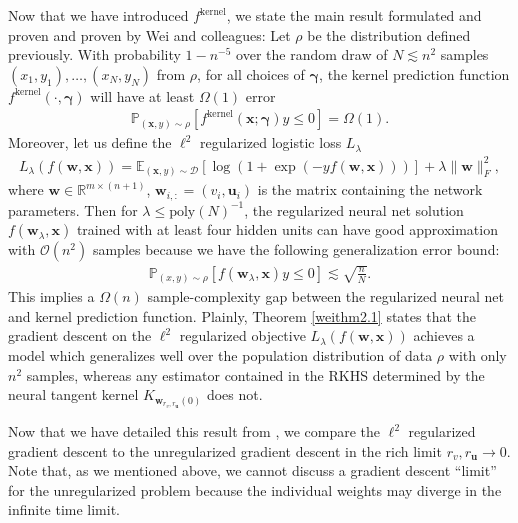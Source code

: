 \documentclass{article}
\newenvironment{manualtheorem}[1]{%
  \renewcommand\themanualtheoreminner{#1}%
  \manualtheoreminner
}{\endmanualtheoreminner}
\begin{document}
Now that we have introduced $f^{\text{kernel}}$, we state the main result formulated and proven and proven by Wei and colleagues: 
\begin{manualtheorem}{2.1}[from \cite{wei2019regularization}]\label{weithm2.1}
Let $\rho$ be the distribution defined previously. With probability $1 - n^{-5}$ over the random draw of $N \lesssim n^2$ samples $(x_1, y_1), \ldots, (x_N, y_N)$ from $\rho$, for all choices of $\boldsymbol{\gamma}$, the kernel prediction function $f^{\text{kernel}}(\cdot, \boldsymbol{\gamma})$ will have at least $\Omega(1)$ error
\begin{align*}
    \mathbb{P}_{(\boldsymbol{x}, y) \sim \rho}[f^{\text{kernel}}(\boldsymbol{x}; \boldsymbol{\gamma})y \leq 0] = \Omega(1).
\end{align*}
Moreover, let us define the $\ell^2$ regularized logistic loss $L_{\lambda}$
\begin{align*}
    L_{\lambda}(f(\boldsymbol{w}, \boldsymbol{x})) = \mathbb{E}_{(\boldsymbol{x}, y) \sim \mathcal{D}} \left[\log \left( 1 + \exp(-y f(\boldsymbol{w}, \boldsymbol{x})) \right) \right] + \lambda \|\boldsymbol{w} \|_F^2,
\end{align*}
where $\boldsymbol{w} \in \mathbb{R}^{m \times (n+1)}$, $\boldsymbol{w}_{i,:} = (v_i, \boldsymbol{u}_i)$ is the matrix containing the network parameters. Then for $\lambda \leq \text{poly}(N)^{-1}$, the regularized neural net solution $f(\boldsymbol{w}_{\lambda}, \boldsymbol{x})$ trained with at least four hidden units can have good approximation with $\mathcal{O}(n^2)$ samples because we have the following generalization error bound:
\begin{align*}
   \mathbb{P}_{(x,y) \sim \rho}[f(\boldsymbol{w}_{\lambda}, \boldsymbol{x})y \leq 0] \lesssim \sqrt{\frac{n}{N}}.
\end{align*}
This implies a $\Omega(n)$ sample-complexity gap between the regularized neural net and kernel prediction function.
\end{manualtheorem}
Plainly, Theorem \ref{weithm2.1} states that the gradient descent on the $\ell^2$ regularized objective $L_{\lambda}(f(\boldsymbol{w}, \boldsymbol{x}))$ achieves a model which generalizes well over the population distribution of data $\rho$ with only $n^2$ samples, whereas any estimator contained in the RKHS determined by the neural tangent kernel $K_{\boldsymbol{w}_{r_v, r_{\boldsymbol{u}}}(0)}$ does not.

Now that we have detailed this result from \cite{wei2019regularization}, we compare the $\ell^2$ regularized gradient descent to the unregularized gradient descent in the rich limit $r_v, r_{\boldsymbol{u}} \rightarrow 0$. Note that, as we mentioned above, we cannot discuss a gradient descent \enquote{limit} for the unregularized problem because the individual weights may diverge in the infinite time limit. %
\end{document}
